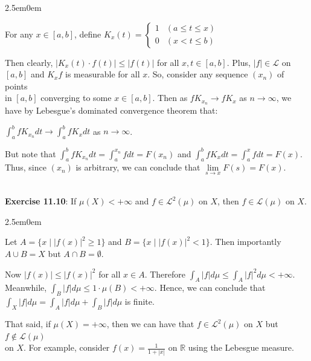 \documentclass{book}
\newcommand{\exTwo}{%
   \color{RedViolet}%
   \fontsize{13}{15}\selectfont%
}
\newenvironment{myIndent}{%
   \begin{adjustwidth}{2.5em}{0em}%
}{%
   \end{adjustwidth}%
}
\newcommand{\mySepTwo}[1][.]{%
   {\noindent\color{#1}{\rule{6.5in}{0.5mm}}}\\%
}
\newcommand{\retTwo}{\hfill\bigbreak}
\begin{document}
{\begin{myIndent}\exTwo
   For any $x \in [a, b]$, define $K_x(t) = \left\{
   \begin{matrix}
      1 & (a \leq t \leq x) \\ 0 & (x < t \leq b)
   \end{matrix}\right.$\retTwo
   
   Then clearly, $|K_x(t) \cdot f(t)| \leq |f(t)|$ for all $x, t \in [a, b]$. Plus, $|f| \in \mathscr{L}$ on\\ $[a, b]$ and $K_x f$ is measurable for all $x$. So, consider any sequence $(x_n)$ of points\\ in $[a, b]$ converging to some $x \in [a, b]$. Then as $fK_{x_n} \rightarrow fK_x$ as $n \rightarrow \infty$, we\\ have by Lebesgue's dominated convergence theorem that: 
   
   {\centering$\int_a^b fK_{x_n}dt \rightarrow \int_a^b fK_xdt$ as $n \rightarrow \infty$.\retTwo\par}

   But note that $\int_a^b fK_{x_n}dt = \int_a^{x_n}fdt = F(x_n)$ and $\int_a^b fK_xdt = \int_a^x fdt = F(x)$.\\ [2pt] Thus, since $(x_n)$ is arbitrary, we can conclude that $\lim\limits_{s\rightarrow x}F(s) = F(x)$.\retTwo
\end{myIndent}}

\mySepTwo

\textbf{Exercise 11.10}: If $\mu(X) < +\infty$ and $f \in \mathscr{L}^2(\mu)$ on $X$, then $f \in \mathscr{L}(\mu)$ on $X$.\\ [-6pt]

{\begin{myIndent}\exTwo
   Let $A = \{x \mid |f(x)|^2 \geq 1\}$ and $B = \{x \mid |f(x)|^2 < 1\}$.  Then importantly\\[2pt] $A \cup B = X$ but $A \cap B = \emptyset$.\retTwo

   Now $|f(x)| \leq |f(x)|^2$ for all $x \in A$. Therefore $\int_A |f|d\mu \leq \int_A |f|^2d\mu < +\infty$.\\[2pt] Meanwhile, $\int_B |f|d\mu \leq 1 \cdot \mu(B) < +\infty$. Hence, we can conclude that\\[2pt] $\int_X|f|d\mu = \int_A|f|d\mu + \int_B|f|d\mu$ is finite.
   \retTwo
\end{myIndent}}

That said, if $\mu(X) = +\infty$, then we can have that $f \in \mathscr{L}^2(\mu)$ on $X$ but $f \notin \mathscr{L}(\mu)$\\ on $X$. For example, consider $f(x) = \frac{1}{1 + |x|}$ on $\mathbb{R}$ using the Lebesgue measure.\\ [-6pt]
\end{document}
